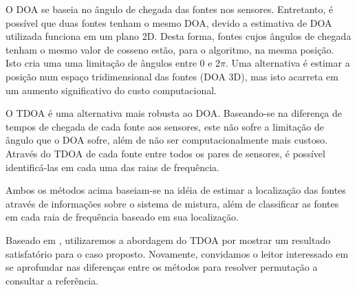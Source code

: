     O DOA se baseia no ângulo de chegada das fontes nos sensores. Entretanto, é possível que duas fontes tenham o mesmo DOA, devido a estimativa de DOA utilizada funciona em um plano 2D. Desta forma, fontes cujos ângulos de chegada tenham o mesmo valor de cosseno estão, para o algoritmo, na mesma posição. Isto cria uma uma limitação de ângulos entre 0 e 2$\pi$. Uma alternativa é estimar a posição num espaço tridimensional das fontes (DOA 3D), mas isto acarreta em um aumento significativo do custo computacional.
    
    O TDOA é uma alternativa mais robusta ao DOA. Baseando-se na diferença de tempos de chegada de cada fonte aos sensores, este não sofre a limitação de ângulo que o DOA sofre, além de não ser computacionalmente mais custoso. Através do TDOA de cada fonte entre todos os pares de sensores, é possível identificá-las em cada uma das raias de frequência.
    
    Ambos os métodos acima baseiam-se na idéia de estimar a localização das fontes através de informações sobre o sistema de mistura, além de classificar as fontes em cada raia de frequência baseado em sua localização.
    
    Baseado em \cite{LuizVictorio}, utilizaremos a abordagem do TDOA por mostrar um resultado satisfatório para o caso proposto. Novamente, convidamos o leitor interessado em se aprofundar nas diferenças entre os métodos para resolver permutação a consultar a referência.